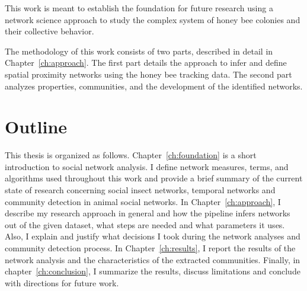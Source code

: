 This work is meant to establish the foundation for future research using a network science approach to study the complex system of honey bee colonies and their collective behavior.

The methodology of this work consists of two parts, described in detail in Chapter~\ref{ch:approach}.
The first part details the approach to infer and define spatial proximity networks using the honey bee tracking data.
The second part analyzes properties, communities, and the development of the identified networks.  

\section{Outline}
This thesis is organized as follows.
Chapter~\ref{ch:foundation} is a short introduction to social network analysis. I define network measures, terms, and algorithms used throughout this work and provide a brief summary of the current state of research concerning social insect networks, temporal networks and community detection in animal social networks.
In Chapter~\ref{ch:approach}, I describe my research approach in general and how the pipeline infers networks out of the given dataset, what steps are needed and what parameters it uses.
Also, I explain and justify what decisions I took during the network analyses and community detection process.
In Chapter~\ref{ch:results}, I report the results of the network analysis and the characteristics of the extracted communities.
Finally, in chapter~\ref{ch:conclusion}, I summarize the results, discuss limitations and conclude with directions for future work.